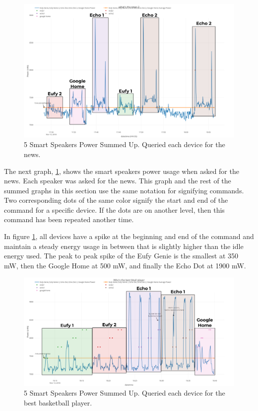 \begin{figure}[H]
  \centering
  \includegraphics[width=1\textwidth]{figures/mixedNewsSum.png}
  \caption{5 Smart Speakers Power Summed Up. Queried each device for the
  news.}
  \label{fig:mixedNewsSum}
\end{figure}

The next graph, \ref{fig:mixedNewsSum}, shows the smart speakers power usage when asked for the news. Each speaker was asked for the news. This graph and the rest of the summed graphs in this section use the same notation for signifying commands. Two corresponding dots of the same color signify the start and end of the command for a specific device. If the dots are on another level, then this command has been repeated another time.

In figure \ref{fig:mixedNewsSum}, all devices have a spike at the beginning and end of the command and maintain a steady energy usage in between that is slightly higher than the idle energy used. The peak to peak spike of the Eufy Genie is the smallest at 350 mW, then the Google Home at 500 mW, and finally the Echo Dot at 1900 mW.

\begin{figure}[H]
  \centering
  \includegraphics[width=1\textwidth]{figures/bestBballSum.png}
  \caption{5 Smart Speakers Power Summed Up. Queried each device for the
  best basketball player.}
  \label{fig:bestBballSum}
\end{figure}

